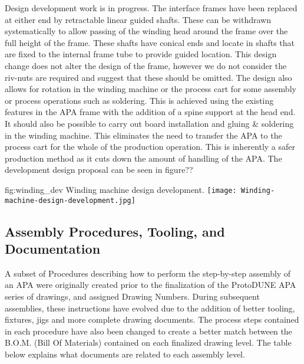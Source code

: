 \begin{itemize}
Design development work is in progress. The interface frames have been replaced at either end by retractable linear guided shafts. These can be withdrawn systematically to allow passing of the winding head around the frame over the full height of the frame. These shafts have conical ends and locate in shafts that are fixed to the internal frame tube to provide guided location. This design change does not alter the design of the frame, however we do not consider the riv-nuts are required and suggest that these should be omitted. The design also allows for rotation in the winding machine or the process cart for some assembly or process operations such as soldering. This is achieved using the existing features in the APA frame with the addition of a spine support at the head end.  It should also be possible to carry out board installation and gluing \& soldering in the winding machine. This eliminates the need to transfer the APA to the process cart for the whole of the production operation. This is inherently a safer production method as it cuts down the amount of handling of the APA. The development design proposal can be seen in figure??
\end{itemize}

\begin{dunefigure}{fig:winding_dev}
{Winding machine design development.}
\texttt{[image: Winding-machine-design-development.jpg]} 
\end{dunefigure}


\subsection{Assembly Procedures, Tooling, and Documentation}
\label{sec:fdsp-apa-assy}

A subset of Procedures describing how to perform the step-by-step assembly of an APA were originally created prior to the finalization of the ProtoDUNE APA series of drawings, and assigned Drawing Numbers. During subsequent assemblies, these instructions have evolved due to the addition of better tooling, fixtures, jigs and more complete drawing documents.  The process steps contained in each procedure have also been changed to create a better match between the B.O.M. (Bill Of Materials) contained on each finalized drawing level.  The table below explains what documents are related to each assembly level.

